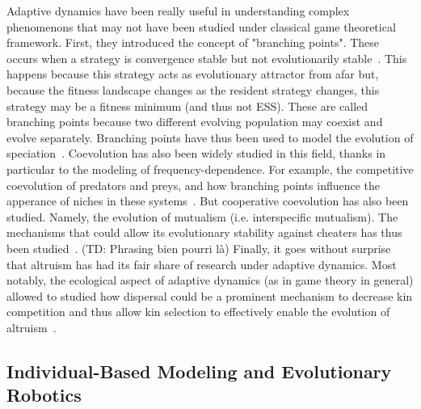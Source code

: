     Adaptive dynamics have been really useful in understanding complex phenomenons that may not have been studied under classical game theoretical framework. First, they introduced the concept of "branching points". These occurs when a strategy is convergence stable but not evolutionarily stable~\cite{Geritz1998}. This happens because this strategy acts as evolutionary attractor from afar but, because the fitness landscape changes as the resident strategy changes, this strategy may be a fitness minimum (and thus not ESS). These are called branching points because two different evolving population may coexist and evolve separately. Branching points have thus been used to model the evolution of speciation~\cite{Geritz2004}. Coevolution has also been widely studied in this field, thanks in particular to the modeling of frequency-dependence. For example, the competitive coevolution of predators and preys, and how branching points influence the apperance of niches in these systems~\cite{Bowers2003}. But cooperative coevolution has also been studied. Namely, the evolution of mutualism (i.e. interspecific mutualism). The mechanisms that could allow its evolutionary stability against cheaters has thus been studied~\cite{Ferriere2002, McGill2005}. (TD: Phrasing bien pourri là) Finally, it goes without surprise that altruism has had its fair share of research under adaptive dynamics. Most notably, the ecological aspect of adaptive dynamics (as in game theory in general) allowed to studied how dispersal could be a prominent mechanism to decrease kin competition and thus allow kin selection to effectively enable the evolution of altruism~\cite{LeGalliard2003, LeGalliard2005}.

    

  \subsection{Individual-Based Modeling and Evolutionary Robotics}

